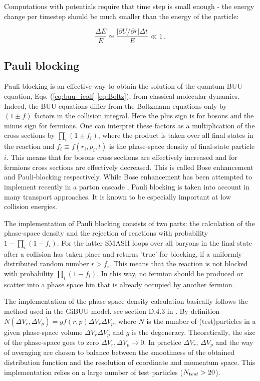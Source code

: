 Computations with potentials require that time step is small enough - the
energy change per timestep should be much smaller than the energy of the
particle:

\begin{equation}
  \frac{\Delta E}{E} \simeq \frac{|\partial U/ \partial r| \Delta t}{E} \ll 1 \,.
\end{equation}

\subsection{Pauli blocking}

Pauli blocking is an effective way to obtain the solution of the quantum BUU
equation, Eqs. (\ref{eq:buu_icoll}-\ref{eq:Boltz}), from classical molecular
dynamics. Indeed, the BUU equations differ from the Boltzmann equations only by $(1
\pm \mathit{f})$ factors in the collision integral. Here the plus sign is for
bosons and the minus sign for fermions. One can interpret these factors as a
multiplication of the cross sections by $\prod_i (1 \pm f_i)$, where the
product is taken over all final states in the reaction and $f_i \equiv
f(r_i,p_i,t)$ is the phase-space density of final-state particle $i$. This
means that for bosons cross sections are effectively increased and for fermions
cross sections are effectively decreased. This is called Bose enhancement and
Pauli-blocking respectively. While Bose enhancement has been attempted to
implement recently in a parton cascade \cite{Xu:2014ega}, Pauli blocking is
taken into account in many transport approaches. It is known to be especially
important at low collision energies.

The implementation of Pauli blocking consists of two parts: the calculation of
the phase-space density and the rejection of reactions with probability $1 -
\prod_i (1-f_i)$. For the latter SMASH loops over all baryons in the final
state after a collision has taken place and returns 'true' for blocking, if a
uniformly distributed random number $r > f_i$. This means that the reaction is
not blocked with probability $\prod_i (1-f_i)$. In this way, no fermion should be
produced or scatter into a phase space bin that is already occupied by another
fermion.

The implementation of the phase space density calculation basically follows the
method used in the GiBUU model, see section D.4.3 in \cite{Buss:2011mx}. By
definition $N(\Delta V_r, \Delta V_p) = g f(r,p) \Delta V_r  \Delta V_p$, where
$N$ is the number of (test)particles in a given phase-space volume $\Delta V_r
\Delta V_p$ and $g$ is the degeneracy. Theoretically, the size of the
phase-space goes to zero $\Delta V_r, \Delta V_p \to 0$. In practice $\Delta
V_r$, $\Delta V_p$ and the way of averaging are chosen to balance between the
smoothness of the obtained distribution function and the resolution of
coordinate and momentum space. This implementation relies on a large number of
test particles ($N_{\textrm test} > 20$).

